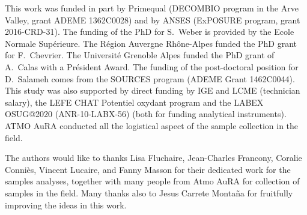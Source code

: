 \documentclass[acp, manuscript]{copernicus}
\begin{document}

\begin{acknowledgements}
This work was funded in part by Primequal (DECOMBIO program in the Arve Valley,
grant ADEME 1362C0028) and by ANSES (ExPOSURE program, grant 2016-CRD-31). The
funding of the PhD for S.~Weber is provided by the Ecole Normale Sup\'{e}rieure.
The R\'{e}gion Auvergne Rh\^{o}ne-Alpes funded the PhD grant for F.~Chevrier. The
Universit\'{e} Grenoble Alpes funded the PhD grant of A.~Calas with a
Pr\'{e}sident Award. The funding of the post-doctoral position for D.~Salameh
comes from the SOURCES program (ADEME Grant 1462C0044). This study was also
supported by direct funding by IGE and LCME (technician salary), the LEFE CHAT
Potentiel oxydant program and the LABEX OSUG@2020 (ANR-10-LABX-56) (both for
funding analytical instruments).  ATMO AuRA conducted all the logistical aspect
of the sample collection in the field.

The authors would like to thanks Lisa Fluchaire, Jean-Charles Francony, Coralie
Conni\`{e}s, Vincent Lucaire, and Fanny Masson for their dedicated work for the
samples analyses, together with many people from Atmo AuRA for collection of
samples in the field. Many thanks also to Jesus Carrete Monta\~{n}a for fruitfully
improving the ideas in this work.
\end{acknowledgements}






%
%
%






\end{document}
